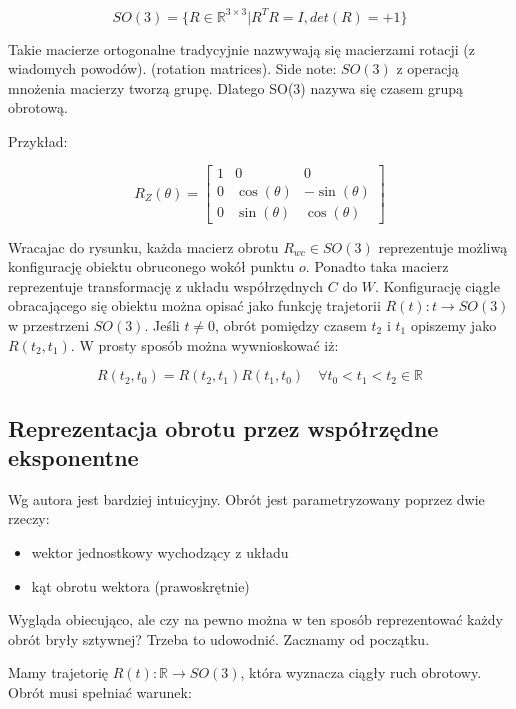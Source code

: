 \documentclass[a4paper,12pt]{article}
\newcommand{\R}{\mathbb{R}}
\newcommand{\RRR}{\mathbb{R}^{3 \times 3}}
\begin{document}
\begin{equation}
SO(3)=\{ R \in \RRR | R^TR = I, det(R)=+1 \}
\end{equation}

Takie macierze ortogonalne tradycyjnie nazwywają się macierzami rotacji (z wiadomych powodów). (rotation matrices). Side note: $SO(3)$ z operacją mnożenia macierzy tworzą grupę. Dlatego SO(3) nazywa się czasem grupą obrotową. 

\noindent Przykład:

\begin{equation}
R_Z(\theta) = 
\begin{bmatrix}
  1 & 0 & 0 \\
  0 & \cos(\theta) & -\sin(\theta) \\
  0 & \sin(\theta) & \cos(\theta)
\end{bmatrix}
\end{equation}

Wracajac do rysunku, każda macierz obrotu $R_{wc} \in SO(3)$ reprezentuje możliwą konfigurację obiektu obruconego wokół punktu $o$. Ponadto taka macierz reprezentuje transformację z układu współrzędnych $C$ do $W$. Konfigurację ciągle obracającego się obiektu można opisać jako funkcję trajetorii $R(t): t \rightarrow SO(3)$ w przestrzeni $SO(3)$. Jeśli $t \neq 0$, obrót pomiędzy czasem $t_2$ i $t_1$ opiszemy jako $R(t_2,t_1)$. W prosty sposób można wywnioskować iż:

\begin{equation}
R(t_2,t_0) = R(t_2,t_1)R(t_1,t_0) \quad \forall t_0 < t_1 < t_2 \in \R
\end{equation}

\subsection{Reprezentacja obrotu przez współrzędne eksponentne}

Wg autora jest bardziej intuicyjny. Obrót jest parametryzowany poprzez dwie rzeczy:

\begin{itemize}
\item wektor jednostkowy wychodzący z układu
\item kąt obrotu wektora (prawoskrętnie)
\end{itemize}

Wygląda obiecująco, ale czy na pewno można w ten sposób reprezentować każdy obrót bryły sztywnej? Trzeba to udowodnić. Zacznamy od początku.

Mamy trajetorię $R(t): \R \rightarrow SO(3)$, która wyznacza ciągły ruch obrotowy. Obrót musi spełniać warunek:
\end{document}
